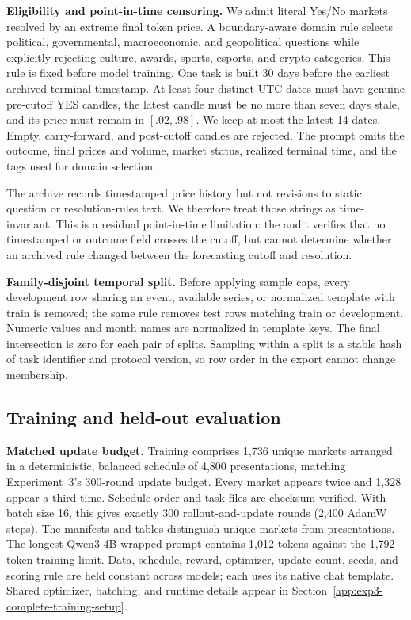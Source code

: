 \noindent\textbf{Eligibility and point-in-time censoring.}
We admit literal Yes/No markets resolved by an extreme final token price. A
boundary-aware domain rule selects political, governmental, macroeconomic, and
geopolitical questions while explicitly rejecting culture, awards, sports,
esports, and crypto categories. This rule is fixed before model training. One task
is built 30 days before the earliest archived terminal timestamp. At least four
distinct UTC dates must have genuine pre-cutoff YES candles, the latest candle must
be no more than seven days stale, and its price must remain in $[.02,.98]$. We keep
at most the latest 14 dates. Empty, carry-forward, and post-cutoff candles are
rejected. The prompt omits the outcome, final prices and volume, market status,
realized terminal time, and the tags used for domain selection.

The archive records timestamped price history but not revisions to static question
or resolution-rules text. We therefore treat those strings as time-invariant. This
is a residual point-in-time limitation: the audit verifies that no timestamped or
outcome field crosses the cutoff, but cannot determine whether an archived rule
changed between the forecasting cutoff and resolution.

\noindent\textbf{Family-disjoint temporal split.}
Before applying sample caps, every development row sharing an event, available
series, or normalized template with train is removed; the same rule removes test
rows matching train or development. Numeric values and month names are normalized
in template keys. The final intersection is zero for each pair of splits. Sampling
within a split is a stable hash of task identifier and protocol version, so row
order in the export cannot change membership.

\subsection{Training and held-out evaluation}

\noindent\textbf{Matched update budget.}
Training comprises 1,736 unique markets arranged in a deterministic, balanced
schedule of 4,800 presentations, matching Experiment~3's 300-round update budget.
Every market appears twice and 1,328 appear a third time. Schedule order and task
files are checksum-verified. With batch size 16, this gives exactly 300
rollout-and-update rounds (2,400 AdamW steps). The manifests and tables distinguish
unique markets from presentations. The longest Qwen3-4B wrapped prompt contains
1,012 tokens against the 1,792-token training limit. Data, schedule, reward,
optimizer, update count, seeds, and scoring rule are held constant across models;
each uses its native chat template.
Shared optimizer, batching, and runtime details appear in
Section~\ref{app:exp3-complete-training-setup}.

